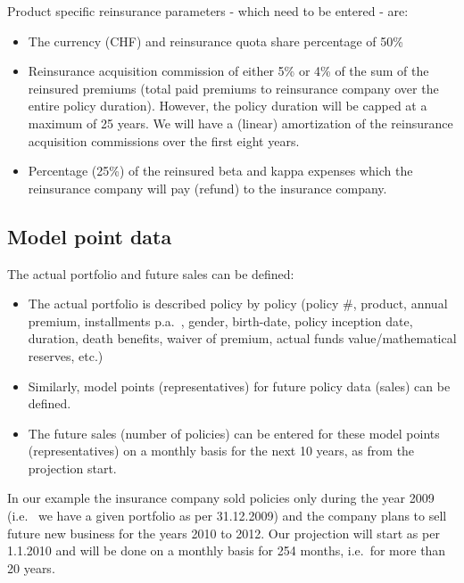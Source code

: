 Product specific reinsurance parameters - which need to be entered - are:

\begin{itemize}
	\item The currency (CHF) and reinsurance quota share percentage of 50\%
	\item Reinsurance acquisition commission of either 5\% or 4\% of the sum of the reinsured premiums (total paid premiums to reinsurance company over the entire policy duration). However, the policy duration will be capped at a maximum of 25 years. We will have a (linear) amortization of the reinsurance acquisition commissions over the first eight years.
	\item Percentage (25\%) of the reinsured beta and kappa expenses which the reinsurance company will pay (refund) to the insurance company.
\end{itemize}

\subsection{Model point data}

The actual portfolio and future sales can be defined: 

\begin{itemize}
	\item The actual portfolio is described policy by policy (policy \#, product, annual premium, installments p.a.~, gender, birth-date, policy inception date, duration, death benefits, waiver of premium, actual funds value/mathematical reserves, etc.)
	\item Similarly, model points (representatives) for future policy data (sales) can be defined.
	\item The future sales (number of policies) can be entered for these model points (representatives) on a monthly basis for the next 10 years, as from the projection start.
\end{itemize}

In our example the insurance company sold policies only during the year 2009 (i.e.~ we have a given portfolio as per 31.12.2009) and the company plans to sell future new business for the years 2010 to 2012. Our projection will start as per 1.1.2010 and will be done on a monthly basis for 254 months, i.e.~for more than 20 years.

